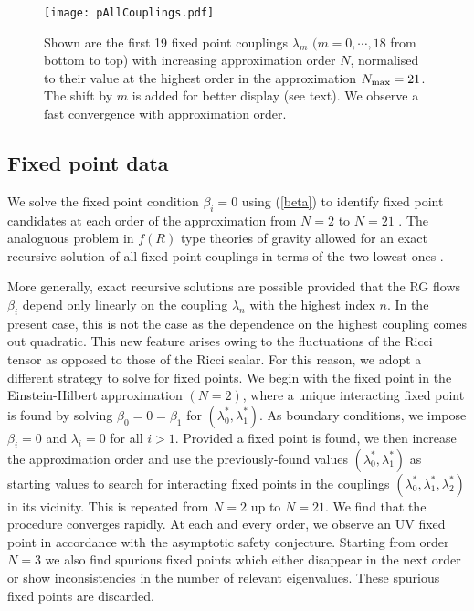 \documentclass[notitlepage,eqsecnum,bm,amsmath,preprintnumbers,superscriptaddress,nofootinbib,aps,11pt]{revtex4-1}
\def\eq#1{(\ref{#1})}
\begin{document}
\begin{figure}[t]
\centering
\begin{center}
\texttt{[image: pAllCouplings.pdf]}
\caption{\label{Lambdas} Shown are the first 19 fixed point couplings $\lambda_m$ $
(m=0,\cdots,18$ from bottom to top) with increasing approximation order $N$, normalised to their value at the 
highest order in the approximation $N_{\rm max}=21$. The shift by $m$ is added for better display  (see text). We observe a fast convergence with approximation order.}
\end{center}
\end{figure}



\subsection{Fixed point data}\label{FPdata}
We solve the fixed point condition $\beta_i=0$ using \eq{beta} to identify fixed point candidates  at each order of the approximation from $N=2$ to $N=21$ \cite{Nikolakopoulos:Thesis,King:MSc}. The analoguous problem in $f(R)$ type theories of gravity allowed for an exact recursive solution of  all fixed point couplings in terms of the two lowest ones \cite{Falls:2013bv,Falls:2014tra}.

More generally, exact recursive solutions are possible provided that the RG flows $\beta_i$ depend only linearly on the coupling $\lambda_n$ with the highest index $n$.  In the present case, this is not the case as the dependence on the highest coupling comes out quadratic. This new feature arises  owing to the fluctuations of the Ricci tensor as opposed to those of the Ricci scalar. For this reason, we adopt a different strategy to solve for fixed points. We begin with the fixed point in the Einstein-Hilbert approximation $(N=2)$, where a unique interacting fixed point is found by solving $\beta_0=0=\beta_1$ for $(\lambda^*_0,\lambda^*_1)$. As boundary conditions, we impose $\beta_i=0$ and $\lambda_i=0$ for all $i>1$. Provided a fixed point is found, we then increase the approximation order and use the previously-found values $(\lambda^*_0,\lambda^*_1)$ as starting values to search for interacting fixed points in the couplings $(\lambda^*_0,\lambda^*_1,\lambda^*_2)$ in its vicinity. This is repeated from $N=2$ up to $N=21$. We find that the procedure converges rapidly. At each and every order, we observe an UV fixed point in accordance with the asymptotic safety conjecture. 
Starting from order $N=3$ we also find spurious fixed points which either disappear in the next order or show inconsistencies in the number of relevant eigenvalues. These spurious fixed points are discarded.
\end{document}
